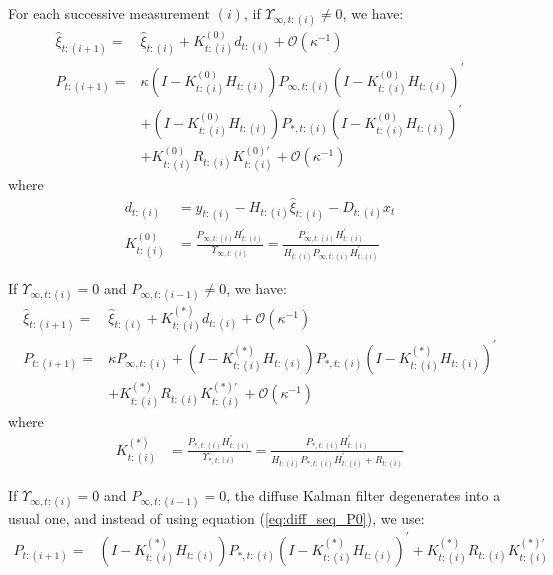 \documentclass[10pt, titlepage]{article}
\numberwithin{equation}{section}
\begin{document}
For each successive measurement $(i)$, if $\Upsilon_{\infty,t:(i)}\neq0$, we have:
\begin{align}
    \hat{\xi}_{t:(i+1)} = & \hat{\xi}_{t:(i)} + K_{t:(i)}^{(0)}d_{t:(i)} + \mathcal{O}(\kappa^{-1}) \label{eq:diff_seq_xi1} \\
    P_{t:(i+1)} =& \kappa(I-K_{t:(i)}^{(0)}H_{t:(i)})P_{\infty,t:(i)}(I-K_{t:(i)}^{(0)}H_{t:(i)})^{'} \label{eq:diff_seq_P1} \\
        & + (I-K_{t:(i)}^{(0)}H_{t:(i)})P_{*,t:(i)}(I-K_{t:(i)}^{(0)}H_{t:(i)})^{'} \nonumber \\
        & + K_{t:(i)}^{(0)}R_{t:(i)}K_{t:(i)}^{(0)'} + \mathcal{O}(\kappa^{-1}) \nonumber
\end{align}
where
\begin{align*}
    d_{t:(i)} &= y_{t:(i)} - H_{t:(i)}\hat{\xi}_{t:(i)}-D_{t:(i)}x_t \\
    K_{t:(i)}^{(0)} &= \frac{P_{\infty,t:(i)}H_{t:(i)}^{'}}{\Upsilon_{\infty,t:(i)}} 
        =\frac{P_{\infty,t:(i)}H_{t:(i)}^{'}}{H_{t:(i)}P_{\infty, t:(i)}H_{t:(i)}^{'}}
\end{align*}

If $\Upsilon_{\infty,t:(i)}=0$ and $P_{\infty,t:(i-1)}\neq 0$, we have:
\begin{align}
    \hat{\xi}_{t:(i+1)} =& \hat{\xi}_{t:(i)} + K_{t:(i)}^{(*)}d_{t:(i)} + \mathcal{O}(\kappa^{-1}) \label{eq:diff_seq_xi0} \\
    P_{t:(i+1)} =& \kappa P_{\infty,t:(i)} + (I-K_{t:(i)}^{(*)}H_{t:(i)})P_{*,t:(i)}(I-K_{t:(i)}^{(*)}H_{t:(i)})^{'} \label{eq:diff_seq_P0} \\
        &+ K_{t:(i)}^{(*)}R_{t:(i)}K_{t:(i)}^{(*)'} + \mathcal{O}(\kappa^{-1}) \nonumber 
\end{align}
where
\begin{align*}
    K_{t:(i)}^{(*)} &= \frac{P_{*,t:(i)}H_{t:(i)}^{'}}{\Upsilon_{*,t:(i)}} = \frac{P_{*,t:(i)}H_{t:(i)}^{'}}{H_{t:(i)}P_{*,t:(i)}H_{t:(i)}^{'} + R_{t:(i)}}
\end{align*}

If $\Upsilon_{\infty,t:(i)}=0$ and $P_{\infty,t:(i-1)}=0$, the diffuse Kalman filter degenerates into a usual one, and instead of using equation (\ref{eq:diff_seq_P0}), we use:
\begin{align}
    P_{t:(i+1)} =& (I-K_{t:(i)}^{(*)}H_{t:(i)})P_{*,t:(i)}(I-K_{t:(i)}^{(*)}H_{t:(i)})^{'} + K_{t:(i)}^{(*)}R_{t:(i)}K_{t:(i)}^{(*)'} \label{eq:usual_seq_P0} 
\end{align}
\end{document}
